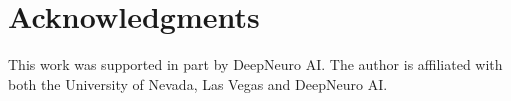\documentclass{article}
\begin{document}
\section*{Acknowledgments}
This work was supported in part by DeepNeuro AI. The author is affiliated with both the University of Nevada, Las Vegas and DeepNeuro AI.




\newpage
\appendix

\end{document}
